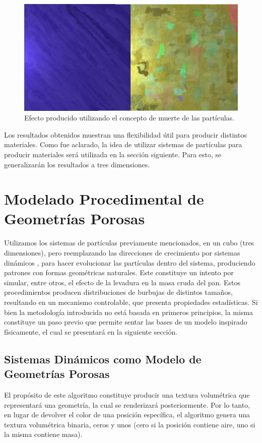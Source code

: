 \begin{figure}[t!]
\centering
\includegraphics[scale=0.2]{figures/muerte}
\caption{Efecto producido utilizando el concepto de muerte de las partículas.}
\label{muerte}
\end{figure}

Los resultados obtenidos muestran una flexibilidad útil para producir distintos materiales.
Como fue aclarado, la idea de utilizar sistemas de partículas para producir materiales será utilizada en la sección siguiente.
Para esto, se generalizarán los resultados a tres dimensiones.

\section{Modelado Procedimental de Geometrías Porosas}

Utilizamos los sistemas de partículas previamente mencionados, en un cubo (tres dimensiones), pero reemplazando las direcciones de crecimiento por sistemas dinámicos \cite{Strogatz2001}, para hacer evolucionar las partículas dentro del sistema, produciendo patrones con formas geométricas naturales.
Este constituye un intento por simular, entre otros,  el efecto de la levadura en la masa cruda del pan.
Estos procedimientos producen distribuciones de burbujas de distintos tamaños, resultando en un mecanismo controlable, que presenta propiedades estadísticas.
Si bien la metodología introducida no está basada en primeros principios, la misma constituye un paso previo que permite sentar las bases de un modelo inspirado físicamente, el cual se presentará en la siguiente sección.

\subsection[Sistemas Dinámicos y Geometrías Porosas]{Sistemas Dinámicos como Modelo de Geometrías Porosas}
El propósito de este algoritmo constituye producir una textura volumétrica que representará una geometría, la cual se renderizará posteriormente.
Por lo tanto, en lugar de devolver el color de una posici\'on espec\'ifica, el algoritmo genera una textura volumétrica binaria, ceros y unos (cero si la posici\'on contiene aire, uno si la misma contiene masa).

